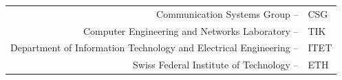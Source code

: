 \begin{titlepage}
	\vspace{5mm} 
	\raggedleft 
	\begin{tabular}
		{rl} Communication Systems Group --& CSG\\
		Computer Engineering and Networks Laboratory --&TIK\\
		Department of Information Technology and Electrical Engineering --& ITET\\
		Swiss Federal Institute of Technology -- & ETH\\
	\end{tabular}
\end{titlepage}
